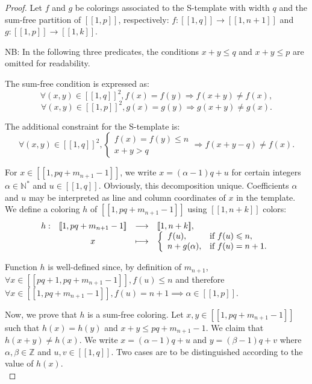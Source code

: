 \documentclass{article}
\newtheorem{computational theorem}[definition]{Computational Theorem}
\begin{document}
\begin{proof}
	Let \(f\) and \(g\) be colorings associated to the S-template with width \(q\) and the sum-free partition of 
	\([\![1,p]\!]\), respectively: \(f : [\![1,q]\!] \longrightarrow [\![1,n+1]\!]\) and 
	\(g : [\![1,p]\!] \longrightarrow [\![1,k]\!]\).
	
	\par
	NB: In the following three predicates, the conditions \(x + y \leqslant q\)  and \(x + y \leqslant p\) are omitted for readability.
	\par
	The sum-free condition is expressed as:
	\[\forall (x,y) \in [\![1,q]\!]^2, f(x) = f(y) \Longrightarrow f(x+y) \neq f(x),\]
	\[\forall (x,y) \in [\![1,p]\!]^2, g(x) = g(y) \Longrightarrow g(x+y) \neq g(x).\]
	
	The  additional constraint for the S-template is:
	\[
	\forall (x,y) \in [\![1,q]\!]^2, \left\{
	\begin{array}{l}
		f(x) = f(y) \leqslant n \\
		x + y > q
	\end{array}
	\right. \Longrightarrow f(x+y-q) \neq f(x).
	\]
	
	For \(x \in [\![1,pq+m_{n+1}-1]\!]\), we write \(x = (\alpha - 1) q + u\) for certain integers \(\alpha \in \mathbb{N}^*\) 
	and \(u \in [\![1,q]\!]\). Obviously, this decomposition unique. Coefficients \(\alpha\) and \(u\) may be interpreted as line 
	and column coordinates of \(x\) in the template. We define a coloring \(h\) of \([\![1,pq+m_{n+1}-1]\!]\) using \( [\![1,n+k]\!]\) colors:
	\[
	\begin{array}{c c c l}
		h : & [\![1,pq+m_{n+1}-1]\!] & \longrightarrow & [\![1,n+k]\!], \\
		& x & \longmapsto & 
		\left\{ \begin{array}{l l}
			f(u), & \text{if}~f(u) \leqslant n, \\
			n + g(\alpha), & \text{if}~f(u) = n + 1. \\
		\end{array} \right.
	\end{array}
	\]
	
	Function \(h\) is well-defined since, by definition of \(m_{n+1}\), \(\forall x \in [\![p q + 1, p q + m_{n + 1} - 1 ]\!], f(u) 
	\leqslant n\) and therefore \(\forall x \in [\![1,pq+m_{n+1}-1]\!], f(u) = n + 1 \implies \alpha \in [\![1, p]\!]\).
	
	\par
	Now, we prove that \(h\) is a sum-free coloring. Let \(x,y \in [\![1,pq + m_{n+1}-1]\!]\) such that \(h(x) = h(y)\) 
	and \(x+y \leqslant pq+m_{n+1}-1\). We claim that \(h(x+y) \neq h(x)\). We write \(x = (\alpha - 1) q + u\) and 
	\(y = (\beta - 1) q + v\) where \(\alpha, \beta \in \mathbb{Z}\) and \(u, v \in [\![1,q]\!]\). Two cases are to be
	distinguished according to the value of \(h(x)\). \\
	

\end{proof}
\end{document}
